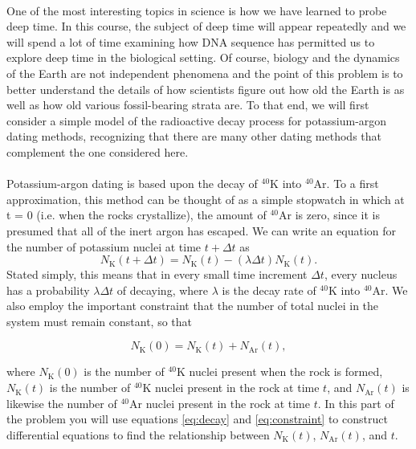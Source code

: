 \documentclass[12pt]{article}    %
\begin{document}
\\


\noindent One of the most interesting topics in science is how we have learned to probe
deep time.  In this course, the subject of deep time will appear repeatedly
and we will spend a lot of time examining how DNA sequence has permitted us
to explore deep time in the biological setting.  Of course, biology and the
dynamics of the Earth are not independent phenomena and the point of
this problem is to better understand the details of how scientists figure out how old the Earth is as well as how old
various fossil-bearing strata are.  To that end, we will first consider a simple model
of the radioactive decay process for potassium-argon dating methods, recognizing
that there are many other dating methods that complement the one
considered here.\\


\\

Potassium-argon dating is based upon the decay of $^{40}$K into
$^{40}$Ar.  To a first approximation, this method can be thought of as a
simple stopwatch in which at t = 0 (i.e. when the rocks crystallize), the amount of $^{40}$Ar is zero, since it is presumed that  all of the inert argon has
escaped. We can write an equation for the number of potassium nuclei at time $t+\Delta t$ as
\begin{equation}
N_\mathrm{K}(t+\Delta t)=N_\mathrm{K}(t)-(\lambda \Delta t) N_\mathrm{K}(t).
\label{eq:decay}
\end{equation}
Stated simply, this means that in every small time increment $\Delta t$, every nucleus
has a probability $\lambda \Delta t$ of decaying, where $\lambda$ is the decay rate of $^{40}\mathrm{K}$ into $^{40}\mathrm{Ar}$. We also employ the important constraint that the number of total nuclei in the system must remain constant, so that

\begin{equation}
    N_\mathrm{K}(0)=N_\mathrm{K}(t)+N_\mathrm{Ar}(t),
\label{eq:constraint}
\end{equation}

\noindent where $N_\mathrm{K}(0)$ is the number of $\mathrm{^{40}K}$ nuclei present when the rock is formed, $N_\mathrm{K}(t)$ is the number of $\mathrm{^{40}K}$ nuclei present in the rock at time $t$, and $N_\mathrm{Ar}(t)$ is likewise the number of $\mathrm{^{40}Ar}$ nuclei present in the rock at time $t$. In this part of the problem you will use equations \ref{eq:decay} and \ref{eq:constraint} to construct differential equations to find the relationship between $N_\mathrm{K}(t)$, $N_\mathrm{Ar}(t)$, and $t$. \\
\end{document}
